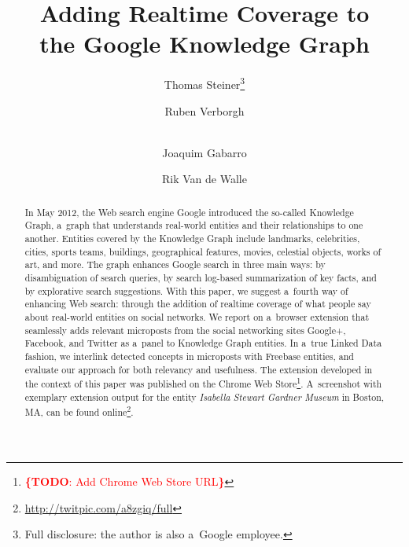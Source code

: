 \documentclass[runningheads,a4paper]{llncs}
\newcommand{\todo}[1]{\noindent\textcolor{red}{{\bf \{TODO}: #1{\bf \}}}}
\begin{document}
\title{Adding Realtime Coverage to\\the Google Knowledge Graph}

\author{Thomas Steiner\thanks{Full disclosure: the author is also a~Google employee.} \and
		Ruben Verborgh \and \\
		Joaquim Gabarro \and 
		Rik Van de Walle		
}


\maketitle
\setcounter{footnote}{0}

\begin{abstract}
In May 2012, the Web search engine Google introduced the so-called Knowledge Graph,
a~graph that understands real-world entities and their relationships to one another.
Entities covered by the Knowledge Graph include landmarks, celebrities, cities, sports
teams, buildings, geographical features, movies, celestial objects, works of art, and more.
The graph enhances Google search in three main ways:
by disambiguation of search queries,
by search log-based summarization of key facts,
and by explorative search suggestions.
With this paper, we suggest a~fourth way of enhancing Web search:
through the addition of realtime coverage
of what people say about real-world entities on social networks.
We report on a~browser extension that seamlessly adds relevant microposts
from the social networking sites Google+, Facebook, and Twitter
as a~panel to Knowledge Graph entities.
In a~true Linked Data fashion, we interlink detected concepts in microposts
with Freebase entities, and evaluate our approach for both relevancy and usefulness.
The extension developed in the context of this paper was published
on the Chrome Web Store\footnote{\todo{Add Chrome Web Store URL}}.
A~screenshot with exemplary extension output for the entity
\emph{Isabella Stewart Gardner Museum} in Boston, MA,
can be found online\footnote{\url{http://twitpic.com/a8zgiq/full}}. 
\end{abstract}
\end{document}
